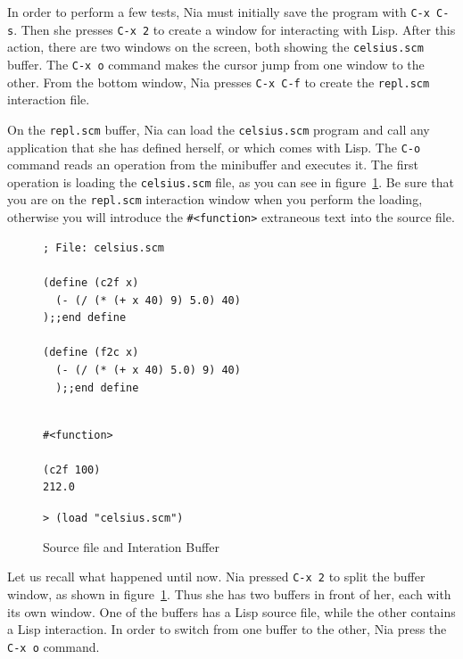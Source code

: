 \documentclass[a4paper,12pt]{book}
\newenvironment{fmpage}[1]
               {\begin{lrbox}{\fmbox}\begin{minipage}{#1}}
               {\end{minipage}\end{lrbox}\fbox{\usebox{\fmbox}}}
\begin{document}
In order to perform a few tests, Nia must initially save
the program with \verb|C-x C-s|. Then she 
presses \verb|C-x 2| to create a window for interacting
with Lisp. After this action, there are two
windows on the screen, both 
showing the \verb|celsius.scm| buffer. The \verb|C-x o| command
makes the cursor jump from one window to the other.
From the bottom window, Nia presses \verb|C-x C-f| to
create the \verb|repl.scm| interaction file. 

On the \verb|repl.scm| buffer, 
Nia can load the \verb|celsius.scm| program
and  call any application that she has defined
herself, or which comes with Lisp.
The \verb|C-o| command reads an operation
from the  minibuffer and executes it.
The first operation is loading
the \verb|celsius.scm| file,
as you can see in figure~\ref{fig:repl}.
 Be sure that you
are on the \verb|repl.scm| 
interaction window when you perform
the loading, otherwise you will introduce
the \verb|#<function>| extraneous 
text into the source file.

\begin{figure}[!b]
\begin{fmpage}{0.8\linewidth}
\begin{verbatim}
; File: celsius.scm

(define (c2f x)
  (- (/ (* (+ x 40) 9) 5.0) 40)
);;end define

(define (f2c x)
  (- (/ (* (+ x 40) 5.0) 9) 40)
  );;end define
\end{verbatim}
\end{fmpage}

\begin{fmpage}{0.8\linewidth}
\begin{verbatim}
  
#<function>

(c2f 100)
212.0

\end{verbatim}
\end{fmpage}

\begin{fmpage}{0.8\linewidth}
\verb|> (load "celsius.scm")|
\end{fmpage}
\caption{Source file and Interation Buffer}
\label{fig:repl}
\end{figure}

Let us recall what happened until now.
Nia pressed \verb|C-x 2| to split 
the buffer window, as shown in figure~\ref{fig:repl}.
Thus she has two buffers in front of her,
each with its own window. One of the buffers has
a Lisp source file, while the other contains a Lisp 
interaction. In order to  switch
from one buffer to the other,
Nia press the \verb|C-x o| command.
\end{document}
